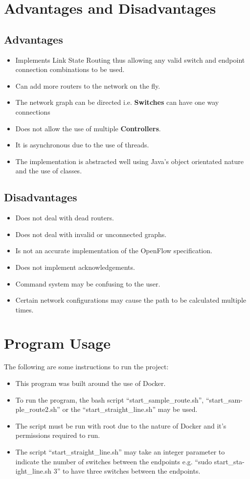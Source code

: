 \documentclass{article}
\begin{document}
\section{Advantages and Disadvantages}
\subsection{Advantages}
\begin{itemize}
  \item{Implements Link State Routing thus allowing any valid switch and
    endpoint connection combinations to be used.}
  \item{Can add more routers to the network on the fly.}
  \item{The network graph can be directed i.e. \textbf{Switches} can have one
    way connections}
  \item{Does not allow the use of multiple \textbf{Controllers}.}
  \item{It is asynchronous due to the use of threads.}
  \item{The implementation is abstracted well using Java's object orientated
    nature and the use of classes.}
\end{itemize}
\subsection{Disadvantages}
\begin{itemize}
  \item{Does not deal with dead routers.}
  \item{Does not deal with invalid or unconnected graphs.}
  \item{Is not an accurate implementation of the OpenFlow specification.}
  \item{Does not implement acknowledgements.}
  \item{Command system may be confusing to the user.}
  \item{Certain network configurations may cause the path to be calculated
    multiple times.}
\end{itemize}

\section{Program Usage}
The following are some instructions to run the project:
\begin{itemize}
  \item{This program was built around the use of Docker.}
  \item{To run the program, the bash script ``start\_sample\_route.sh'',
    ``start\_sam-\\ple\_route2.sh'' or the ``start\_straight\_line.sh'' may be
  used.}
  \item{The script must be run with root due to the nature of Docker and it's
    permissions required to run.}
  \item{The script ``start\_straight\_line.sh'' may take an integer parameter
    to indicate the number of switches between the endpoints e.g. ``sudo
  start\_sta-\\ight\_line.sh 3'' to have three switches between the endpoints.}
\end{itemize}
\end{document}
